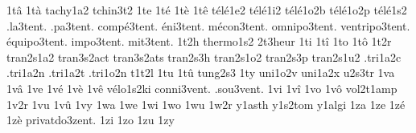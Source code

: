 {1t\^a
1t\`a
                    tachy1a2
                    tchin3t2
1te
1t\'e
1t\`e
1t\^e
                    t\'el\'e1e2
                    t\'el\'e1i2
                    t\'el\'e1o2b
                    t\'el\'e1o2p
                    t\'el\'e1s2
     .la3tent.
     .pa3tent.
 comp\'e3tent.
   \'eni3tent.
 m\'econ3tent.
  omnipo3tent.
ventripo3tent.
\'equipo3tent.
    impo3tent.
     mit3tent.
1t2h
                    thermo1s2
                    2t3heur
1ti
1t\^i
1to
1t\^o
1t2r
                    tran2s1a2
                    tran3s2act
                    tran3s2ats
                    tran2s3h
                    tran2s1o2
                    tran2s3p
                    tran2s1u2
                    .tri1a2c
                    .tri1a2n
                    .tri1a2t
                    .tri1o2n
                    t1t2l
1tu
1t\^u
tung2s3
1ty
                    uni1o2v
                    uni1a2x
                    u2s3tr
1va
1v\^a
1ve
1v\'e
1v\`e
1v\^e
                    v\'elo1s2ki
conni3vent.
 .sou3vent.
1vi
1v\^i
1vo
1v\^o
                    vol2t1amp
1v2r
1vu
1v\^u
1vy
1wa
1we
1wi
1wo
1wu
1w2r
                    y1asth
                    y1s2tom
                    y1algi
1za
1ze
1z\'e
1z\`e
privatdo3zent.
1zi
1zo
1zu
1zy
}
\endgroup
\endinput
